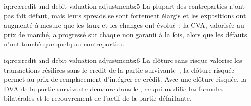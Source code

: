 \begin{solution}{iq:rc:credit-and-debit-valuation-adjustments:5}
La plupart des contreparties n'ont pas fait défaut, mais leurs spreads se sont fortement élargis et les expositions ont augmenté à mesure que
les taux et les changes ont évolué~: la CVA, valorisée au prix de marché, a progressé sur chaque  non garanti à
la fois, alors que les défauts n'ont touché que quelques contreparties.
\end{solution}

\begin{solution}{iq:rc:credit-and-debit-valuation-adjustments:6}
La clôture sans risque valorise les transactions résiliées sans le crédit de la partie survivante~; la clôture risquée
permet au prix de remplacement d'intégrer ce crédit. Avec une clôture risquée, la DVA de la partie survivante
demeure dans le , ce qui modifie les formules bilatérales et le recouvrement de
l'actif de la partie défaillante.
\end{solution}
